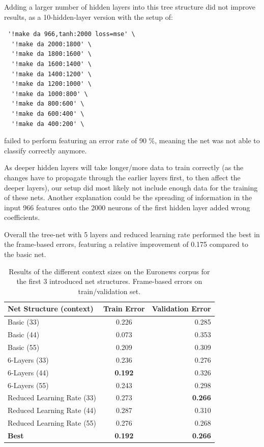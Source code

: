 Adding a larger number of hidden layers into this tree structure did not improve results, as a 10-hidden-layer version with the setup of:

\begin{verbatim}
 '!make da 966,tanh:2000 loss=mse' \
  '!make da 2000:1800' \
  '!make da 1800:1600' \
  '!make da 1600:1400' \
  '!make da 1400:1200' \
  '!make da 1200:1000' \
  '!make da 1000:800' \
  '!make da 800:600' \
  '!make da 600:400' \
  '!make da 400:200' \
\end{verbatim}

failed to perform featuring an error rate of 90 \%, meaning the net was not able to classify correctly anymore.

As deeper hidden layers will take longer/more data to train correctly (as the changes have to propagate through the earlier layers first, to then affect the deeper layers), our setup did most likely not include enough data for the training of these nets. Another explanation could be the spreading of information in the input 966 features onto the 2000 neurons of the first hidden layer added wrong coefficients.

Overall the tree-net with 5 layers and reduced learning rate performed the best in the frame-based errors, featuring a relative improvement of 0.175 compared to the basic net.

\begin{table}[h!]
\caption{Results of the different context sizes on the Euronews corpus for the first 3 introduced net structures. Frame-based errors on train/validation set.}
\label{tab:resCtx}
\centering
\begin{tabular}{| l | c | r | }
	\hline
	\textbf{Net Structure (context)} & \textbf{Train Error} & \textbf{Validation Error}  \\
	\hline
	Basic (33) & 0.226 &  0.285 \\
	\hline
	Basic (44) & 0.073 & 0.353 \\
	\hline
	Basic (55) & 0.209 & 0.309 \\
	\hline
	6-Layers (33) & 0.236 & 0.276 \\
	\hline
	6-Layers (44) & \textbf{0.192} & 0.326 \\
	\hline
	6-Layers (55) & 0.243 & 0.298 \\
	\hline
	Reduced Learning Rate (33) & 0.273 & \textbf{0.266} \\ 
	\hline
	Reduced Learning Rate (44) & 0.287 & 0.310 \\ 
	\hline
	Reduced Learning Rate (55) & 0.276 & 0.268 \\ 
	\hline
	\textbf{Best} & \textbf{0.192} & \textbf{0.266} \\
	\hline
\end{tabular}
\end{table}


